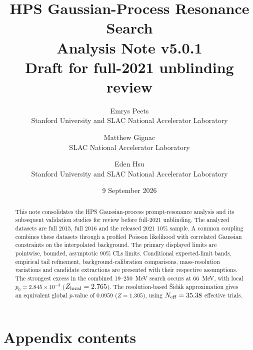 \documentclass[11pt]{article}
\title{HPS Gaussian-Process Resonance Search\\[0.5em]
\large Analysis Note v5.0.1\\Draft for full-2021 unblinding review}
\author{Emrys Peets\\Stanford University and SLAC National Accelerator Laboratory
\and Matthew Gignac\\SLAC National Accelerator Laboratory
\and Eden Hsu\\Stanford University and SLAC National Accelerator Laboratory}
\date{9 September 2026}
\makeatletter
\def\CLs{CLs}%
\newcommand{\CLs}{CL$_\mathrm{s}$}
\newcommand{\startappendixcontents}{%
\let\vfiveoriginaladdcontentsline\addcontentsline
\renewcommand{\addcontentsline}[3]{%
\vfiveoriginaladdcontentsline{##1}{##2}{##3}%
\def\vfivefirst{##1}\def\vfivetoc{toc}%
\ifx\vfivefirst\vfivetoc\vfiveoriginaladdcontentsline{apc}{##2}{##3}\fi}}
\newcommand{\appendixcontents}{\section*{Appendix contents}{\setcounter{tocdepth}{2}\@starttoc{apc}}}
\makeatother
\begin{document}
\maketitle
\begin{abstract}
This note consolidates the HPS Gaussian-process prompt-resonance analysis and
its subsequent validation studies for review before full-2021 unblinding.
The analyzed datasets are full 2015, full 2016 and the released 2021 10\% sample.
A common coupling combines these datasets through a profiled Poisson
likelihood with correlated Gaussian constraints on the interpolated background.
The primary displayed limits are pointwise, bounded, asymptotic 90\% \CLs{}
limits. Conditional expected-limit bands, empirical tail refinement,
background-calibration comparisons, mass-resolution variations and candidate
extractions are presented with their respective assumptions.
The strongest excess in the combined 19--250~MeV search occurs at 66~MeV,
with local $p_0=2.845\times10^{-3}$ ($Z_{\rm local}=2.765$).
The resolution-based \v{S}id\'ak approximation gives an equivalent global
$p$-value of $0.0959$ ($Z=1.305$), using $N_{\rm eff}=35.38$ effective trials.
\end{abstract}
\clearpage{\small\tableofcontents}
\clearpage

\FloatBarrier\clearpage

\FloatBarrier\clearpage

\FloatBarrier\clearpage



\FloatBarrier\clearpage

\FloatBarrier\clearpage


\FloatBarrier\clearpage

\FloatBarrier\clearpage
\appendix
{}
\startappendixcontents

\FloatBarrier\clearpage
{\footnotesize\appendixcontents}
\clearpage

\FloatBarrier\clearpage

\FloatBarrier\clearpage

\FloatBarrier\clearpage

\FloatBarrier\clearpage

\clearpage

\clearpage

\FloatBarrier\clearpage
\let\addcontentsline\vfiveoriginaladdcontentsline


\end{document}
